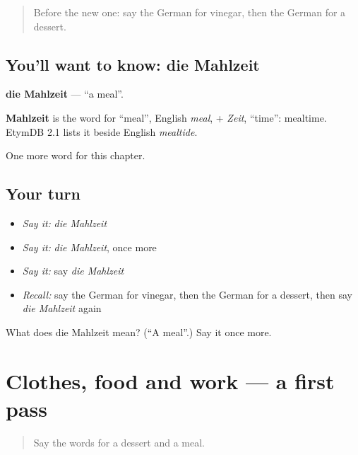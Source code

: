 \begin{quote}
Before the new one: say the German for vinegar, then the German for a dessert.
\end{quote}

\subsection*{You'll want to know: die Mahlzeit}
\textbf{die Mahlzeit} — \textquotedblleft{}a meal\textquotedblright{}.

\begin{cousinweb}
\textbf{Mahlzeit} is the word for \textquotedblleft{}meal\textquotedblright{}, English \emph{meal}, + \emph{Zeit}, \textquotedblleft{}time\textquotedblright{}: mealtime. EtymDB 2.1 lists it beside English \emph{mealtide}.
\end{cousinweb}

\begin{grammarlens}[title={What you've built}]
One more word for this chapter.
\end{grammarlens}

\subsection*{Your turn}
\begin{itemize}
\raggedright
  \item \emph{Say it:} \emph{die Mahlzeit}
  \item \emph{Say it:} \emph{die Mahlzeit}, once more
  \item \emph{Say it:} say \emph{die Mahlzeit}
  \item \emph{Recall:} say the German for vinegar, then the German for a dessert, then say \emph{die Mahlzeit} again
\end{itemize}

\begin{tcolorbox}[breakable,colback=teal!4,colframe=teal!35!black,title={Before you move on}]
What does die Mahlzeit mean? (\textquotedblleft{}A meal\textquotedblright{}.) Say it once more.
\end{tcolorbox}
\section[(dialogue)]{Clothes, food and work — a first pass}

\label{lesson:GE-R123-first-pass-clothes-food-and-work}



\begin{quote}
Say the words for a dessert and a meal.
\end{quote}

